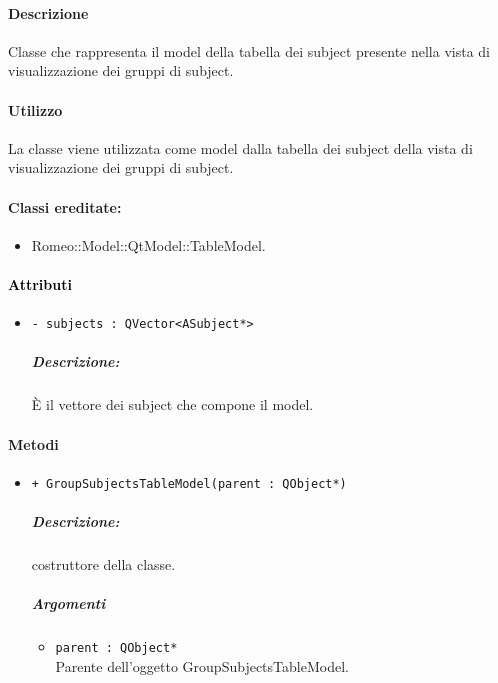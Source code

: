{\paragraph{Descrizione\\} 
Classe che rappresenta il model della tabella dei subject\g{} presente nella vista di visualizzazione dei gruppi di subject\g{}.

\paragraph{Utilizzo\\}
La classe viene utilizzata come model dalla tabella dei subject\g{} della vista di visualizzazione dei gruppi di subject\g{}.

\paragraph{Classi ereditate:}
\begin{itemize}
	\item Romeo::Model::QtModel::TableModel.
\end{itemize}

\paragraph{\textcolor{black}{Attributi\\}}
	\begin{itemize}
		\item \color{teal}\verb!- subjects : QVector<ASubject*>!
		\color{black}
		\subparagraph{Descrizione:} È il vettore dei subject\g{} che compone il model.
	\end{itemize}
	
\paragraph{\color{black}Metodi\\}
\begin{itemize}
	\item \color{blue}\verb!+ GroupSubjectsTableModel(parent : QObject*)!\\
		\color{black}
		\subparagraph{Descrizione:} costruttore della classe.\\
		\subparagraph{Argomenti}
			\begin{itemize}
				\item \color{RoyalPurple}\verb!parent : QObject*!\\
				\color{Black}Parente dell'oggetto GroupSubjectsTableModel.
			\end{itemize}
			

\end{itemize}}
